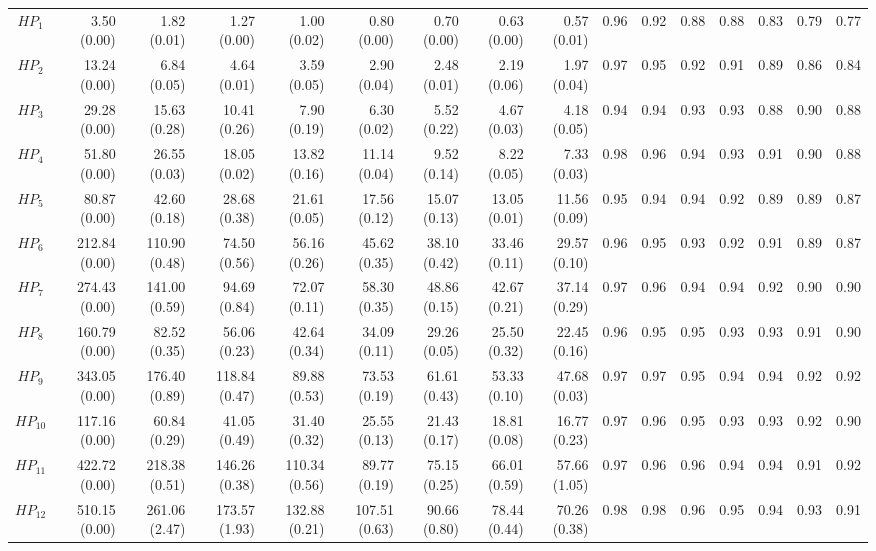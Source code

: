 \documentclass[preprint]{tlp}
\begin{document}
\begin{landscape}
\begin{tabular}{@{\extracolsep{\fill}}|c|r|r|r|r|r|r|r|r||r|r|r|r|r|r|r|}
\cline{1-16}
$HP_1$&3.50 (0.00) &  1.82 (0.01) &  1.27 (0.00) &  1.00 (0.02) &  0.80 (0.00) &  0.70 (0.00) &  0.63 (0.00) &  0.57 (0.01) &  0.96 & 0.92 & 0.88 & 0.88 & 0.83 & 0.79 & 0.77 \\
$HP_2$&13.24 (0.00) &  6.84 (0.05) &  4.64 (0.01) &  3.59 (0.05) &  2.90 (0.04) &  2.48 (0.01) &  2.19 (0.06) &  1.97 (0.04) & 0.97 & 0.95 & 0.92 & 0.91 & 0.89 & 0.86 & 0.84 \\
$HP_3$&29.28 (0.00) &  15.63 (0.28) &  10.41 (0.26) &  7.90 (0.19) &  6.30 (0.02) &  5.52 (0.22) &  4.67 (0.03) &  4.18 (0.05) & 0.94 & 0.94 & 0.93 & 0.93 & 0.88 & 0.90 & 0.88 \\
$HP_4$&51.80 (0.00) &  26.55 (0.03) &  18.05 (0.02) &  13.82 (0.16) &  11.14 (0.04) &  9.52 (0.14) &  8.22 (0.05) &  7.33 (0.03) & 0.98 & 0.96 & 0.94 & 0.93 & 0.91 & 0.90 & 0.88 \\
$HP_5$&80.87 (0.00) &  42.60 (0.18) &  28.68 (0.38) &  21.61 (0.05) &  17.56 (0.12) &  15.07 (0.13) &  13.05 (0.01) &  11.56 (0.09) & 0.95 & 0.94 & 0.94 & 0.92 & 0.89 & 0.89 & 0.87 \\
$HP_6$&212.84 (0.00) &  110.90 (0.48) &  74.50 (0.56) &  56.16 (0.26) &  45.62 (0.35) &  38.10 (0.42) &  33.46 (0.11) &  29.57 (0.10) &0.96 & 0.95 & 0.93 & 0.92 & 0.91 & 0.89 & 0.87 \\
$HP_7$&274.43 (0.00) &  141.00 (0.59) &  94.69 (0.84) &  72.07 (0.11) &  58.30 (0.35) &  48.86 (0.15) &  42.67 (0.21) &  37.14 (0.29) & 0.97 & 0.96 & 0.94 & 0.94 & 0.92 & 0.90 & 0.90 \\
$HP_8$&160.79 (0.00) &  82.52 (0.35) &  56.06 (0.23) &  42.64 (0.34) &  34.09 (0.11) &  29.26 (0.05) &  25.50 (0.32) &  22.45 (0.16) & 0.96 & 0.95 & 0.95 & 0.93 & 0.93 & 0.91 & 0.90 \\
$HP_9$&343.05 (0.00) &  176.40 (0.89) &  118.84 (0.47) &  89.88 (0.53) &  73.53 (0.19) &  61.61 (0.43) &  53.33 (0.10) &  47.68 (0.03) & 0.97 & 0.97 & 0.95 & 0.94 & 0.94 & 0.92 & 0.92 \\
$HP_{10}$&117.16 (0.00) &  60.84 (0.29) &  41.05 (0.49) &  31.40 (0.32) &  25.55 (0.13) &  21.43 (0.17) &  18.81 (0.08) &  16.77 (0.23) & 0.97 & 0.96 & 0.95 & 0.93 & 0.93 & 0.92 & 0.90 \\
$HP_{11}$&422.72 (0.00) &  218.38 (0.51) &  146.26 (0.38) &  110.34 (0.56) &  89.77 (0.19) &  75.15 (0.25) &  66.01 (0.59) &  57.66 (1.05) & 0.97 & 0.96 & 0.96 & 0.94 & 0.94 & 0.91 & 0.92 \\
$HP_{12}$&510.15 (0.00) &  261.06 (2.47) &  173.57 (1.93) &  132.88 (0.21) &  107.51 (0.63) &  90.66 (0.80) &  78.44 (0.44) &  70.26 (0.38) & 0.98 & 0.98 & 0.96 & 0.95 & 0.94 & 0.93 & 0.91 \\
\cline{1-16}


\end{tabular}

  \label{tab_2}
\end{landscape}
\end{document}
